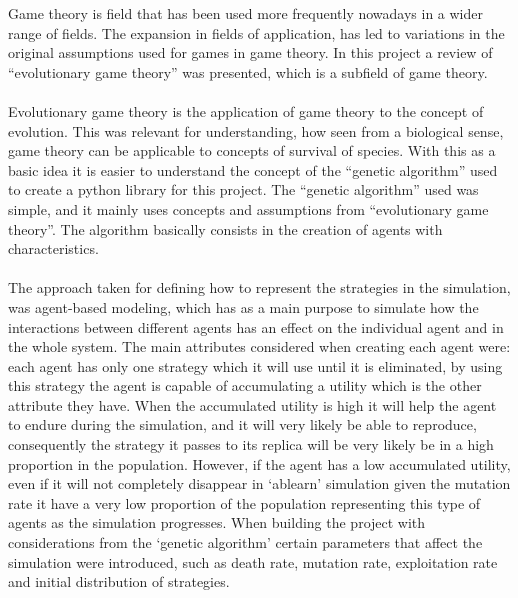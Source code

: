 Game theory is field that has been used more frequently nowadays in a wider range of fields. The expansion in fields of application, has led to variations in the original assumptions used for games in game theory. In this project a review of  ``evolutionary game theory'' was presented, which is a subfield of game theory.
\\\\ Evolutionary game theory is the application of game theory to the concept of evolution. This was relevant for understanding, how seen from a biological sense, game theory can be applicable to concepts of survival of species. With this as a basic idea it is easier to understand the concept of the ``genetic algorithm'' used to create a python library for this project. The ``genetic algorithm'' used was simple, and it mainly uses concepts and assumptions from ``evolutionary game theory''. The algorithm basically consists in the creation of agents with characteristics. 
\\\\The approach taken for defining how to represent the strategies in the simulation, was agent-based modeling, which has as a main purpose to simulate how the interactions between different agents has an effect on the individual agent and in the whole system. The main attributes considered when creating each agent were: each agent has only one strategy which it will use until it is eliminated, by using this strategy the agent is capable of accumulating a utility which is the other attribute they have. When the accumulated utility is high it will help the agent to endure during the simulation, and it will very likely be able to reproduce, consequently the strategy it passes to its replica will be very likely be in a high proportion in the population. However, if the agent has a low accumulated utility, even if it will not completely disappear in `ablearn' simulation given the mutation rate it have a very low proportion of the population representing this type of agents as the simulation progresses. When building the project with considerations from the `genetic algorithm' certain parameters that affect the simulation were introduced, such as death rate, mutation rate, exploitation rate and initial distribution of strategies. 
